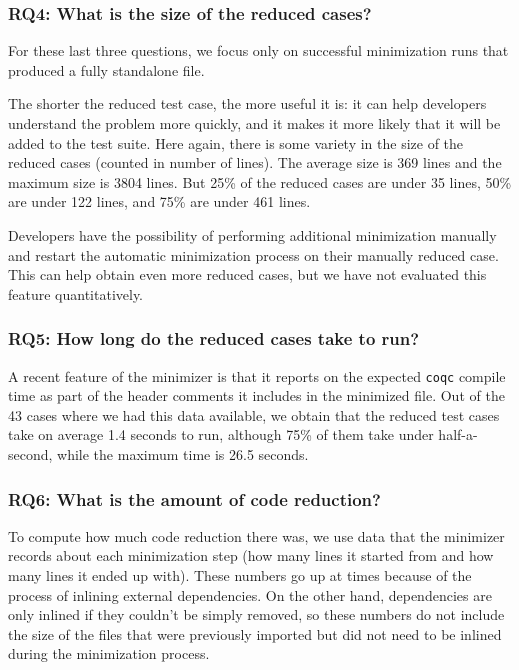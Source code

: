 \documentclass[a4paper,USenglish,cleveref,autoref,thm-restate]{lipics-v2021}
\begin{document}
\subsubsection{RQ4: What is the size of the reduced cases?}

For these last three questions, we focus only on successful minimization runs that produced a fully standalone file.

The shorter the reduced test case, the more useful it is: it can help developers understand the problem more quickly, and it makes it more likely that it will be added to the test suite. Here again, there is some variety in the size of the reduced cases (counted in number of lines). The average size is 369 lines and the maximum size is 3804 lines. But 25\% of the reduced cases are under 35 lines, 50\% are under 122 lines, and 75\% are under 461 lines.

Developers have the possibility of performing additional minimization manually and restart the automatic minimization process on their manually reduced case. This can help obtain even more reduced cases, but we have not evaluated this feature quantitatively.

\subsubsection{RQ5: How long do the reduced cases take to run?}

A recent feature of the minimizer is that it reports on the expected \texttt{coqc} compile time as part of the header comments it includes in the minimized file. Out of the 43 cases where we had this data available, we obtain that the reduced test cases take on average 1.4 seconds to run, although 75\% of them take under half-a-second, while the maximum time is 26.5 seconds.

\subsubsection{RQ6: What is the amount of code reduction?}

To compute how much code reduction there was, we use data that the minimizer records about each minimization step (how many lines it started from and how many lines it ended up with). These numbers go up at times because of the process of inlining external dependencies. On the other hand, dependencies are only inlined if they couldn't be simply removed, so these numbers do not include the size of the files that were previously imported but did not need to be inlined during the minimization process.
\end{document}
